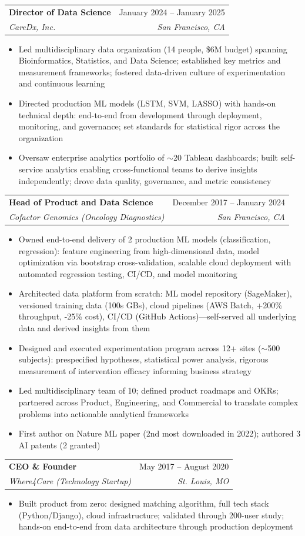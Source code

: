 \documentclass[letterpaper,11pt]{article}
\makeatletter
\newcommand{\resumeItem}[1]{
  \item\small{
    {#1 \vspace{-2pt}}
  }
}
\newcommand{\resumeSubheading}[4]{
  \vspace{-2pt}\item
    \begin{tabular*}{0.97\textwidth}[t]{l@{\extracolsep{\fill}}r}
      \textbf{#1} & #2 \\
      \textit{\small#3} & \textit{\small #4} \\
    \end{tabular*}\vspace{-7pt}
}
\newcommand{\resumeItemListStart}{\begin{itemize}}
\newcommand{\resumeItemListEnd}{\end{itemize}\vspace{-5pt}}
\makeatother
\begin{document}
    \resumeSubheading
      {Director of Data Science}{January 2024 -- January 2025}
      {CareDx, Inc.}{San Francisco, CA}
      \resumeItemListStart
        \resumeItem{Led multidisciplinary data organization (14 people, \$6M budget) spanning Bioinformatics, Statistics, and Data Science; established key metrics and measurement frameworks; fostered data-driven culture of experimentation and continuous learning}
        \resumeItem{Directed production ML models (LSTM, SVM, LASSO) with hands-on technical depth: end-to-end from development through deployment, monitoring, and governance; set standards for statistical rigor across the organization}
        \resumeItem{Oversaw enterprise analytics portfolio of $\sim$20 Tableau dashboards; built self-service analytics enabling cross-functional teams to derive insights independently; drove data quality, governance, and metric consistency}
      \resumeItemListEnd

    \resumeSubheading
      {Head of Product and Data Science}{December 2017 -- January 2024}
      {Cofactor Genomics (Oncology Diagnostics)}{San Francisco, CA}
      \resumeItemListStart
        \resumeItem{Owned end-to-end delivery of 2 production ML models (classification, regression): feature engineering from high-dimensional data, model optimization via bootstrap cross-validation, scalable cloud deployment with automated regression testing, CI/CD, and model monitoring}
        \resumeItem{Architected data platform from scratch: ML model repository (SageMaker), versioned training data (100s GBs), cloud pipelines (AWS Batch, +200\% throughput, -25\% cost), CI/CD (GitHub Actions)---self-served all underlying data and derived insights from them}
        \resumeItem{Designed and executed experimentation program across 12+ sites ($\sim$500 subjects): prespecified hypotheses, statistical power analysis, rigorous measurement of intervention efficacy informing business strategy}
        \resumeItem{Led multidisciplinary team of 10; defined product roadmaps and OKRs; partnered across Product, Engineering, and Commercial to translate complex problems into actionable analytical frameworks}
        \resumeItem{First author on Nature ML paper (2nd most downloaded in 2022); authored 3 AI patents (2 granted)}
      \resumeItemListEnd

    \resumeSubheading
      {CEO \& Founder}{May 2017 -- August 2020}
      {Where4Care (Technology Startup)}{St. Louis, MO}
      \resumeItemListStart
        \resumeItem{Built product from zero: designed matching algorithm, full tech stack (Python/Django), cloud infrastructure; validated through 200-user study; hands-on end-to-end from data architecture through production deployment}
      \resumeItemListEnd
\end{document}
